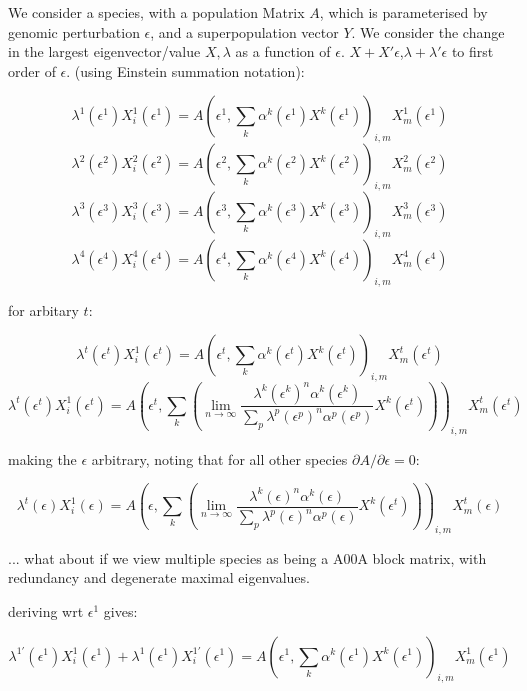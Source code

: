 \documentclass{article}
\begin{document}

We consider a species, with a population Matrix $A$, which is parameterised by genomic perturbation $\epsilon$, and a superpopulation vector $Y$. We consider the change in the largest eigenvector/value $X,\lambda$ as a function of $\epsilon$.
$X+X'\epsilon$,$\lambda+\lambda'\epsilon$ to first order of $\epsilon$. (using Einstein summation notation):

$$ \lambda^1(\epsilon^1)X_{i}^1(\epsilon^1) = A(\epsilon^1,\sum_k\alpha^k(\epsilon^1)X^k(\epsilon^1))_{i,m}X_{m}^1(\epsilon^1) $$
$$ \lambda^2(\epsilon^2)X_{i}^2(\epsilon^2) = A(\epsilon^2,\sum_k\alpha^k(\epsilon^2)X^k(\epsilon^2))_{i,m}X_{m}^2(\epsilon^2) $$
$$ \lambda^3(\epsilon^3)X_{i}^3(\epsilon^3) = A(\epsilon^3,\sum_k\alpha^k(\epsilon^3)X^k(\epsilon^3))_{i,m}X_{m}^3(\epsilon^3) $$
$$ \lambda^4(\epsilon^4)X_{i}^4(\epsilon^4) = A(\epsilon^4,\sum_k\alpha^k(\epsilon^4)X^k(\epsilon^4))_{i,m}X_{m}^4(\epsilon^4) $$

for arbitary $t$:

$$ \lambda^t(\epsilon^t)X_{i}^1(\epsilon^t) = A(\epsilon^t,\sum_k\alpha^k(\epsilon^t)X^k(\epsilon^t))_{i,m}X_{m}^t(\epsilon^t) $$
$$ \lambda^t(\epsilon^t)X_{i}^1(\epsilon^t) = A(\epsilon^t,\sum_k\left( \lim_{n\rightarrow\infty} \frac{\lambda^k(\epsilon^k)^n\alpha^k(\epsilon^k)}{\sum_p\lambda^p(\epsilon^p)^n\alpha^p(\epsilon^p)}X^k(\epsilon^t) \right))_{i,m}X_{m}^t(\epsilon^t) $$

making the $\epsilon$ arbitrary, noting that for all other species $\partial A / \partial \epsilon =0$:

$$ \lambda^t(\epsilon)X_{i}^1(\epsilon) = A(\epsilon,\sum_k\left( \lim_{n\rightarrow\infty} \frac{\lambda^k(\epsilon)^n\alpha^k(\epsilon)}{\sum_p\lambda^p(\epsilon)^n\alpha^p(\epsilon)}X^k(\epsilon^t) \right))_{i,m}X_{m}^t(\epsilon) $$

... what about if we view multiple species as being a A00A block matrix, with redundancy and degenerate maximal eigenvalues.



deriving wrt $\epsilon^1$ gives:

$$ \lambda^{1\prime}(\epsilon^1)X_{i}^1(\epsilon^1) + \lambda^1(\epsilon^1)X_{i}^{1\prime}(\epsilon^1) = A(\epsilon^1,\sum_k\alpha^k(\epsilon^1)X^k(\epsilon^1))_{i,m}X_{m}^1(\epsilon^1) $$
\end{document}
